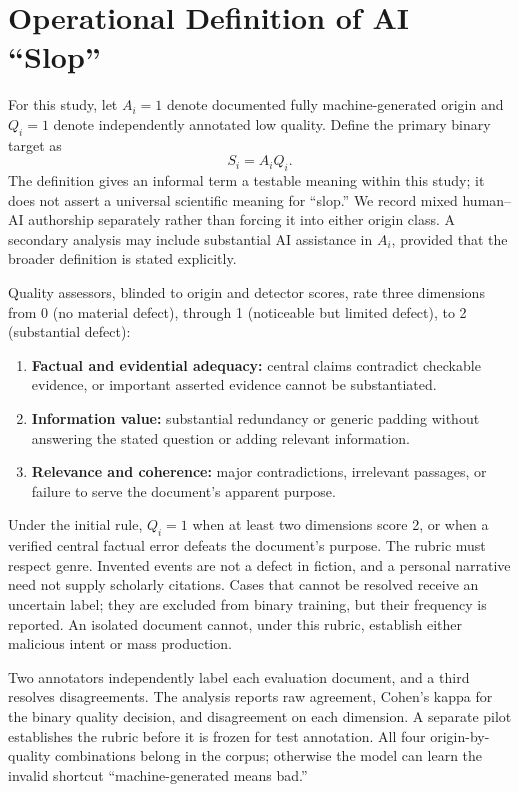 \documentclass[11pt]{article}
\begin{document}
\section{Operational Definition of AI ``Slop''}
For this study, let $A_i=1$ denote documented fully machine-generated origin
and $Q_i=1$ denote independently annotated low quality. Define the primary
binary target as
\begin{equation}
 S_i = A_i Q_i.
\end{equation}
The definition gives an informal term a testable meaning within this study;
it does not assert a universal scientific meaning for ``slop.'' We record
mixed human--AI authorship separately rather than forcing it into either
origin class. A secondary analysis may include substantial AI assistance in
$A_i$, provided that the broader definition is stated explicitly.

Quality assessors, blinded to origin and detector scores, rate three dimensions
from 0 (no material defect), through 1 (noticeable but limited defect), to
2 (substantial defect):
\begin{enumerate}
\item \textbf{Factual and evidential adequacy:} central claims contradict
checkable evidence, or important asserted evidence cannot be substantiated.
\item \textbf{Information value:} substantial redundancy or generic padding
without answering the stated question or adding relevant information.
\item \textbf{Relevance and coherence:} major contradictions, irrelevant passages,
or failure to serve the document's apparent purpose.
\end{enumerate}
Under the initial rule, $Q_i=1$ when at least two dimensions score 2, or when
a verified central factual error defeats the document's purpose. The rubric
must respect genre. Invented events are not a defect in fiction, and a
personal narrative need not supply scholarly citations. Cases that cannot be
resolved receive an uncertain label; they are excluded from binary training,
but their frequency is reported. An isolated document cannot, under this
rubric, establish either malicious intent or mass production.

Two annotators independently label each evaluation document, and a third
resolves disagreements. The analysis reports raw agreement, Cohen's kappa
for the binary quality decision, and disagreement on each dimension. A
separate pilot establishes the rubric before it is frozen for test annotation.
All four origin-by-quality combinations belong in the corpus; otherwise the
model can learn the invalid shortcut ``machine-generated means bad.''
\end{document}
